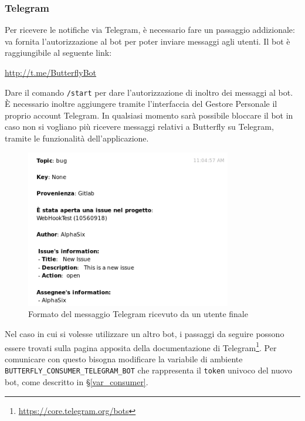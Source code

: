 \subsubsection{Telegram}

Per ricevere le notifiche via Telegram, è necessario fare un passaggio addizionale: va fornita l'autorizzazione al bot per poter inviare messaggi agli utenti.
Il bot è raggiungibile al seguente link:
\begin{center}
    \url{http://t.me/ButterflyBot}
\end{center}

Dare il comando \texttt{/start} per dare l'autorizzazione di inoltro dei messaggi al bot.
È necessario inoltre aggiungere tramite l'interfaccia del Gestore Personale il proprio account Telegram.
In qualsiasi momento sarà possibile bloccare il bot in caso non si vogliano più ricevere messaggi relativi a Butterfly su Telegram, tramite le funzionalità dell'applicazione.
\begin{figure}[H]
	\centering
	\includegraphics[width=9cm]{img/notifica_telegram_1.png}
	\caption{Formato del messaggio Telegram ricevuto da un utente finale}
\end{figure}
Nel caso in cui si volesse utilizzare un altro bot, i passaggi da seguire possono essere trovati sulla pagina apposita della documentazione di Telegram\footnote{\url{https://core.telegram.org/bots}}.
Per comunicare con questo bisogna modificare la variabile di ambiente \texttt{BUTTERFLY\_CONSUMER\_TELEGRAM\_BOT} che rappresenta il \texttt{token} univoco del nuovo bot, come descritto in \S\ref{var_consumer}.
